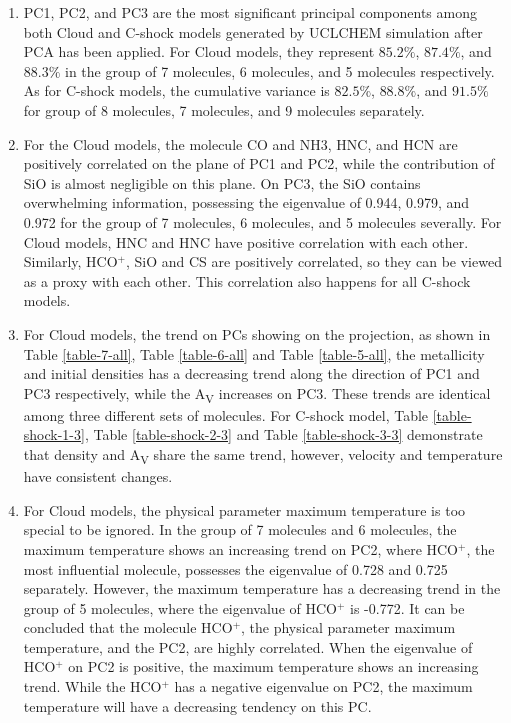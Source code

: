 \documentclass{aa}
\begin{document}
\begin{CJK*}{UTF8}{gbsn}
   \begin{enumerate}
      \item 
      PC1, PC2, and PC3 are the most significant principal components among both Cloud and C-shock models generated by UCLCHEM simulation after PCA has been applied. 
      For Cloud models, they represent $85.2\%$, $87.4\%$, and $88.3\%$ in the group of 7 molecules, 6 molecules, and 5 molecules respectively.
      As for C-shock models, the cumulative variance is $82.5\%$, $88.8\%$, and $91.5\%$ for group of 8 molecules, 7 molecules, and 9 molecules separately. 
      
      \item 
      For the Cloud models, the molecule CO and NH3, HNC, and HCN are positively correlated on the plane of PC1 and PC2, while the contribution of SiO is almost negligible on this plane. 
      On PC3, the SiO contains overwhelming information, possessing the eigenvalue of 0.944, 0.979, and 0.972 for the group of 7 molecules, 6 molecules, and 5 molecules severally.
      For Cloud models, HNC and HNC have positive correlation with each other.
      Similarly, HCO$^+$, SiO and CS are positively correlated, so they can be viewed as a proxy with each other. 
      This correlation also happens for all C-shock models.
      
      \item 
      For Cloud models, the trend on PCs showing on the projection, as shown in Table \ref{table-7-all}, Table \ref{table-6-all} and Table \ref{table-5-all}, the metallicity and initial densities has a decreasing trend along the direction of PC1 and PC3 respectively, while the A\textsubscript{V} increases on PC3.
      These trends are identical among three different sets of molecules. 
      For C-shock model, Table \ref{table-shock-1-3}, Table \ref{table-shock-2-3} and Table \ref{table-shock-3-3} demonstrate that density and A\textsubscript{V} share the same trend, however, velocity and temperature have consistent changes. 
      
      \item 
      For Cloud models, the physical parameter maximum temperature is too special to be ignored.
      In the group of 7 molecules and 6 molecules, the maximum temperature shows an increasing trend on PC2, where HCO$^+$, the most influential molecule, possesses the eigenvalue of 0.728 and 0.725 separately. 
      However, the maximum temperature has a decreasing trend in the group of 5 molecules, where the eigenvalue of HCO$^+$ is -0.772. 
      It can be concluded that the molecule HCO$^+$, the physical parameter maximum temperature, and the PC2, are highly correlated. 
      When the eigenvalue of HCO$^+$ on PC2 is positive, the maximum temperature shows an increasing trend. 
      While the HCO$^+$ has a negative eigenvalue on PC2, the maximum temperature will have a decreasing tendency on this PC. 
      

\end{enumerate}
\end{CJK*}
\end{document}
